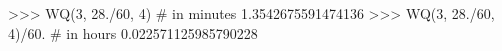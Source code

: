 
>>> WQ(3, 28./60, 4)   # in minutes
1.3542675591474136
>>> WQ(3, 28./60, 4)/60. # in hours
0.022571125985790228

